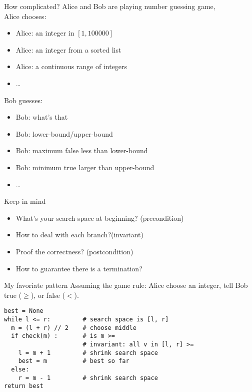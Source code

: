 \documentclass{beamer}
\begin{document}
\begin{frame}{How complicated?}
 Alice and Bob are playing number guessing game,\\
  {Alice chooses:}
 \begin{itemize}
  \item<2-> Alice: an integer in $[1, 100000]$
  \item<3-> Alice: an integer from a sorted list
  \item<4-> Alice: a continuous range of integers
  \item<4-> \ldots
 \end{itemize}

  {Bob guesses:}
 \begin{itemize}
   \item<5-> Bob: what's that 
   \item<6-> Bob: lower-bound/upper-bound
   \item<7-> Bob: maximum false less than lower-bound
   \item<8-> Bob: minimum true larger than upper-bound
   \item<8-> \ldots
 \end{itemize}


\end{frame}

\begin{frame}{Keep in mind}
\begin{itemize}
  \item What's your search space at beginning? (precondition)
  \item How to deal with each branch?(invariant)
  \item Proof the correctness? (postcondition)
  \item How to guarantee there is a termination?
\end{itemize}
\end{frame}

\begin{frame}[fragile]{My favoriate pattern}
  Assuming the game rule: Alice choose an integer, tell Bob true ($\ge$), 
  or false ($<$).
\begin{verbatim}
best = None
while l <= r:         # search space is [l, r]
  m = (l + r) // 2    # choose middle
  if check(m) :       # is m >=  
                      # invariant: all v in [l, r] >=
    l = m + 1         # shrink search space 
    best = m          # best so far
  else:
    r = m - 1         # shrink search space
return best
\end{verbatim}
\end{frame}
\end{document}
